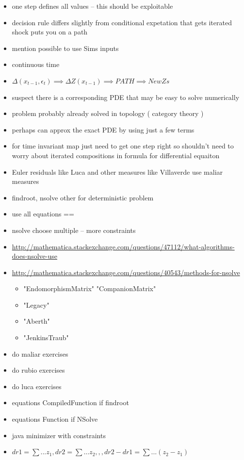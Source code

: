 \documentclass[12pt]{article}
\begin{document}
\begin{itemize}
\item one step defines all values  --  this should be exploitable
\item decision rule differs slightly from conditional expetation that gets iterated shock puts you on a path
\item mention possible to use Sims inputs
\item continuous time
\item $\Delta(x_{t-1},\epsilon_t) \implies \Delta Z(x_{t-1}) \implies PATH \implies NewZs$
\item suspect there is a corresponding PDE that may be easy to solve numerically
\item problem probably already solved in topology ( category theory )
\item perhaps can approx the exact PDE by using just a few terms
\item for time invariant map just need to get one step right so shouldn't need to worry about iterated compositions in formula for differential equaiton
\item Euler residuals like Luca and other measures like Villaverde use maliar measures 
\item findroot, nsolve other for deterministic problem
\item use all equations ==
\item nsolve choose multiple --  more constraints
\item \href{mathematica nsolve info}{http://mathematica.stackexchange.com/questions/47112/what-algorithms-does-nsolve-use}
\item \href{some choices}{http://mathematica.stackexchange.com/questions/40543/methods-for-nsolve}
  \begin{itemize}
  \item "EndomorphismMatrix"
"CompanionMatrix"
\item 
"Legacy"
\item 
"Aberth"
\item 
"JenkinsTraub"
  \end{itemize}
\item do maliar exercises
\item do rubio exercises
\item do luca exercises
\item equations CompiledFunction if findroot
\item equations Function if NSolve
\item java minimizer with constraints 
\item $dr1 = \sum ... z_1, dr2 = \sum ... z_2,,, dr2 - dr1= \sum ... (z_2-z_1)$

\end{itemize}
\end{document}

